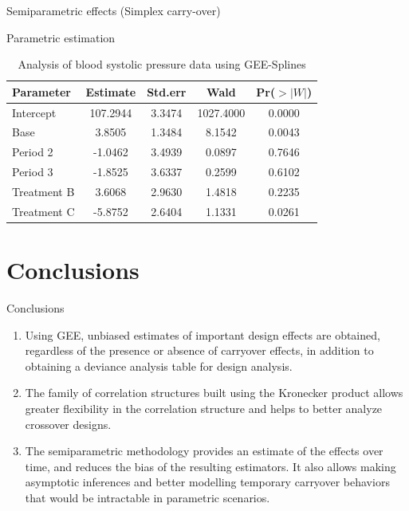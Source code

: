 \documentclass[t,9pt]{beamer}
\begin{document}
\begin{frame}[fragile]{Semiparametric effects (Simplex carry-over)}
\vfill
\begin{block}{Parametric estimation}
\begin{table}[ht]
 \centering    \captionsetup{justification=centering,margin=2cm}
\begin{tabular}{|l|c|c|c|c|}
  \hline
 Parameter & Estimate & Std.err & Wald & Pr($>|W|$) \\ 
  \hline
Intercept & 107.2944 & 3.3474 & 1027.4000 & 0.0000 \\ 
  Base & 3.8505 & 1.3484 & 8.1542 & 0.0043 \\ 
  Period 2 & -1.0462 & 3.4939 & 0.0897 & 0.7646 \\ 
  Period 3 & -1.8525 & 3.6337 & 0.2599 & 0.6102 \\ 
  Treatment B & 3.6068 & 2.9630 & 1.4818 & 0.2235 \\ 
  Treatment C & -5.8752 & 2.6404 & 1.1331 & 0.0261 \\ 
   \hline
\end{tabular}
\caption{Analysis of blood systolic pressure data using GEE-Splines}
\end{table}    
\end{block}
\end{frame}
\section{Conclusions}
\begin{frame}[fragile]{Conclusions}
\vfill
    \begin{enumerate}
\item Using GEE, unbiased estimates of important design effects are obtained, regardless of the presence or absence of carryover effects, in addition to obtaining a deviance analysis table for design analysis.
       \item The family of correlation structures built using the Kronecker product allows greater flexibility in the correlation structure and helps to better analyze crossover designs.
       \item The semiparametric methodology provides an estimate of the effects over time, and reduces the bias of the resulting estimators. It also allows making asymptotic inferences and better modelling temporary carryover behaviors that would be intractable in parametric scenarios.
\end{enumerate}
\end{frame}
\end{document}
